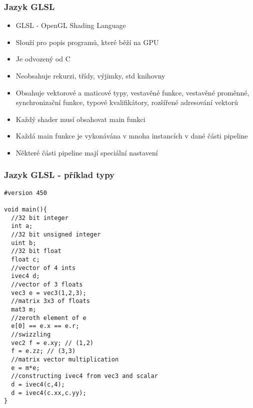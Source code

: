 \begin{frame}
\frametitle{Jazyk GLSL}
  \begin{itemize}
  \item GLSL - OpenGL Shading Language
  \item Slouží pro popis programů, které běží na GPU
  \item Je odvozený od C
  \item Neobsahuje rekurzi, třídy, výjimky, std knihovny
  \item Obsahuje vektorové a maticové typy, vestavěné funkce, vestavěné proměnné, synchronizační funkce, typové kvalifikátory, rozšířené adresování vektorů
  \item Každý shader musí obsahovat main funkci
  \item Každá main funkce je vykonávána v mnoha instancích v dané části pipeline
  \item Některé části pipeline mají speciální nastavení
  \end{itemize}
\end{frame}

\begin{frame}[fragile]
\frametitle{Jazyk GLSL - příklad typy}
		{\scriptsize
		\begin{verbatim}
#version 450

void main(){
  //32 bit integer
  int a;
  //32 bit unsigned integer
  uint b;
  //32 bit float
  float c;
  //vector of 4 ints
  ivec4 d;
  //vector of 3 floats
  vec3 e = vec3(1,2,3);
  //matrix 3x3 of floats
  mat3 m;
  //zeroth element of e
  e[0] == e.x == e.r;
  //swizzling 
  vec2 f = e.xy; // (1,2)
  f = e.zz; // (3,3)
  //matrix vector multiplication
  e = m*e;
  //constructing ivec4 from vec3 and scalar
  d = ivec4(c,4);
  d = ivec4(c.xx,c.yy);
}
		\end{verbatim}
		}
\end{frame}

